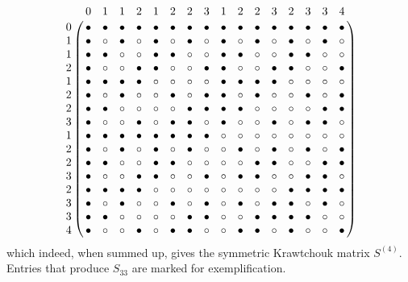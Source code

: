 \documentclass[12pt]{article}    %
\begin{document}
$$
\bordermatrix{
  &0  &1  &1  &2   &1  &2  &2  &3   &1  &2  &2  &3   &2  &3  &3  &4   \cr 
0 &\a &\a &\a &\a  &\a &\a &\a &\a  &\a &\a &\a &\a  &\a &\a &\a &\a  \cr
1 &\a &\b &\a &\b  &\a &\b &\a &\b  &\a &\b &\a &\b  &\a &\b &\a &\b  \cr 
1 &\a &\a &\b &\b  &\a &\a &\b &\b  &\a &\a &\b &\b  &\a &\a &\b &\b  \cr
2 &\a &\b &\b &\a  &\a &\b &\b &\a  &\a &\b &\b &\a  &\a &\b &\b &\a  \cr
%
1 &\a &\a &\a &\a  &\b &\b &\b &\b  &\a &\a &\a &\a  &\b &\b &\b &\b  \cr
2 &\a &\b &\a &\b  &\b &\a &\b &\a  &\a &\b &\a &\b  &\b &\a &\b &\a  \cr
2 &\a &\a &\b &\b  &\b &\b &\a &\a  &\a &\a &\b &\b  &\b &\b &\a &\a  \cr
3 &\a &\b &\b &\a  &\b &\a &\a &\b  &\a &\b &\b &\a  &\b &\a &\a &\b  \cr
%
1 &\a &\a &\a &\a  &\a &\a &\a &\a  &\b &\b &\b &\b  &\b &\b &\b &\b  \cr
2 &\a &\b &\a &\b  &\a &\b &\a &\b  &\b &\a &\b &\a  &\b &\a &\b &\a  \cr
2 &\a &\a &\b &\b  &\a &\a &\b &\b  &\b &\b &\a &\a  &\b &\b &\a &\a  \cr
3 &\a &\b &\b &\a  &\a &\b &\b &\a  &\b &\a &\a &\b  &\b &\a &\a &\b  \cr
%
2 &\a &\a &\a &\a  &\b &\b &\b &\b  &\b &\b &\b &\b  &\a &\a &\a &\a  \cr
3 &\a &\b &\a &\b  &\b &\a &\b &\a  &\b &\a &\b &\a  &\a &\b &\a &\b  \cr
3 &\a &\a &\b &\b  &\b &\b &\a &\a  &\b &\b &\a &\a  &\a &\a &\b &\b  \cr
4 &\a &\b &\b &\a  &\b &\a &\a &\b  &\b &\a &\a &\b  &\a &\b &\b &\a  \cr
}
$$
which indeed, when summed up, gives the symmetric Krawtchouk
matrix $S^{(4)}$.  
Entries that produce $S_{33}$ are marked for exemplification.

\end{document}
